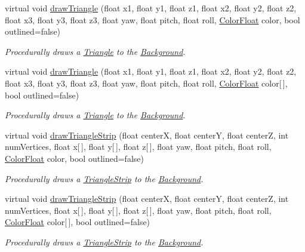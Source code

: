 \begin{DoxyCompactItemize}
virtual void \hyperlink{classtsgl_1_1_background_adfeb2af747148f47412d5ce239b5b107}{draw\+Triangle} (float x1, float y1, float z1, float x2, float y2, float z2, float x3, float y3, float z3, float yaw, float pitch, float roll, \hyperlink{structtsgl_1_1_color_float}{Color\+Float} color, bool outlined=false)
\begin{DoxyCompactList}\small\item\em Procedurally draws a \hyperlink{classtsgl_1_1_triangle}{Triangle} to the \hyperlink{classtsgl_1_1_background}{Background}. \end{DoxyCompactList}\item 
virtual void \hyperlink{classtsgl_1_1_background_a28e685d75184c2c631634be06ab9ebb3}{draw\+Triangle} (float x1, float y1, float z1, float x2, float y2, float z2, float x3, float y3, float z3, float yaw, float pitch, float roll, \hyperlink{structtsgl_1_1_color_float}{Color\+Float} color\mbox{[}$\,$\mbox{]}, bool outlined=false)
\begin{DoxyCompactList}\small\item\em Procedurally draws a \hyperlink{classtsgl_1_1_triangle}{Triangle} to the \hyperlink{classtsgl_1_1_background}{Background}. \end{DoxyCompactList}\item 
virtual void \hyperlink{classtsgl_1_1_background_a3aa71c5d98fafc33701e22a7faee196b}{draw\+Triangle\+Strip} (float centerX, float centerY, float centerZ, int num\+Vertices, float x\mbox{[}$\,$\mbox{]}, float y\mbox{[}$\,$\mbox{]}, float z\mbox{[}$\,$\mbox{]}, float yaw, float pitch, float roll, \hyperlink{structtsgl_1_1_color_float}{Color\+Float} color, bool outlined=false)
\begin{DoxyCompactList}\small\item\em Procedurally draws a \hyperlink{classtsgl_1_1_triangle_strip}{Triangle\+Strip} to the \hyperlink{classtsgl_1_1_background}{Background}. \end{DoxyCompactList}\item 
virtual void \hyperlink{classtsgl_1_1_background_a8698cc2d4b102b8e1b60b4a1f8ed677a}{draw\+Triangle\+Strip} (float centerX, float centerY, float centerZ, int num\+Vertices, float x\mbox{[}$\,$\mbox{]}, float y\mbox{[}$\,$\mbox{]}, float z\mbox{[}$\,$\mbox{]}, float yaw, float pitch, float roll, \hyperlink{structtsgl_1_1_color_float}{Color\+Float} color\mbox{[}$\,$\mbox{]}, bool outlined=false)
\begin{DoxyCompactList}\small\item\em Procedurally draws a \hyperlink{classtsgl_1_1_triangle_strip}{Triangle\+Strip} to the \hyperlink{classtsgl_1_1_background}{Background}. \end{DoxyCompactList}\item 

\end{DoxyCompactItemize}
